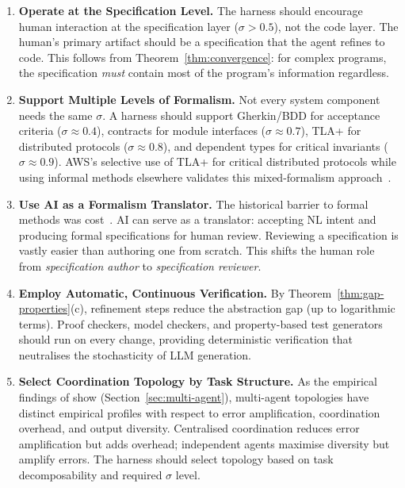 \documentclass[11pt, a4paper, logo, copyright]{googledeepmind}
\begin{document}
\begin{enumerate}
    \item \textbf{Operate at the Specification Level.} The harness should encourage human interaction at the specification layer ($\sigma > 0.5$), not the code layer. The human's primary artifact should be a specification that the agent refines to code. This follows from Theorem~\ref{thm:convergence}: for complex programs, the specification \emph{must} contain most of the program's information regardless.

    \item \textbf{Support Multiple Levels of Formalism.} Not every system component needs the same $\sigma$. A harness should support Gherkin/BDD for acceptance criteria ($\sigma \approx 0.4$), contracts for module interfaces ($\sigma \approx 0.7$), TLA+ for distributed protocols ($\sigma \approx 0.8$), and dependent types for critical invariants ($\sigma \approx 0.9$). AWS's selective use of TLA+ for critical distributed protocols while using informal methods elsewhere validates this mixed-formalism approach~\citep{newcombe2015amazon}.

    \item \textbf{Use AI as a Formalism Translator.} The historical barrier to formal methods was cost~\citep{kleppmann2025formal}. AI can serve as a translator: accepting NL intent and producing formal specifications for human review. Reviewing a specification is vastly easier than authoring one from scratch. This shifts the human role from \emph{specification author} to \emph{specification reviewer}.

    \item \textbf{Employ Automatic, Continuous Verification.} By Theorem~\ref{thm:gap-properties}(c), refinement steps reduce the abstraction gap (up to logarithmic terms). Proof checkers, model checkers, and property-based test generators should run on every change, providing deterministic verification that neutralises the stochasticity of LLM generation.

    \item \textbf{Select Coordination Topology by Task Structure.} As the empirical findings of \citet{kim2025scaling} show (Section~\ref{sec:multi-agent}), multi-agent topologies have distinct empirical profiles with respect to error amplification, coordination overhead, and output diversity. Centralised coordination reduces error amplification but adds overhead; independent agents maximise diversity but amplify errors. The harness should select topology based on task decomposability and required $\sigma$ level.


\end{enumerate}
\end{document}
